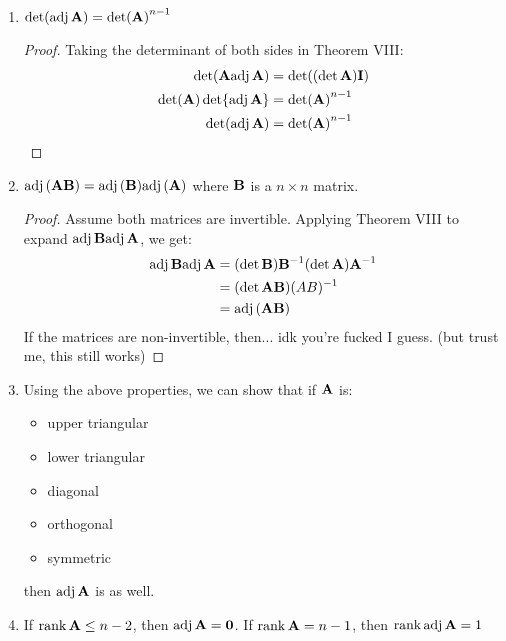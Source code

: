 \documentclass{article}
\begin{document}
\begin{enumerate}
\begin{proof}
\begin{equation*}
                \bff{A}^T\adj(\bff{A})^T = \bff{A}^T\adj(\bff{A}^T)
            \end{equation*}
            If $\bff{A}$ is not the zero matrix, then this directly proves it. If $\bff{A}$ is the zero matrix, then from property $1$, we get: $\adj(\bff{A}^T)=\bff{0}$ and $\adj(\bff{A})^T = \bff{0}^T=\bff{0}$.
        \end{proof}
        \item $\det(\mathrm{adj}\,\mathbf{A})= \det(\mathbf{A})^{n-1}$
        \begin{proof}
            Taking the determinant of both sides in Theorem VIII:
            \begin{align*}
                \det(\mathbf{A}\mathrm{adj}\,\mathbf{A})&=\det((\det \mathbf{A})\mathbf{I}) \\ 
                \det(\mathbf{A})\det{\mathrm{adj}\,\mathbf{A}}&=\det(\mathbf{A})^{n-1} \\ 
                \det(\mathrm{adj}\,\mathbf{A}) &= \det(\mathbf{A})^{n-1}
            \end{align*}
        \end{proof}
        \item $\mathrm{adj}\,(\mathbf{A}\mathbf{B})=\mathrm{adj}\,(\mathbf{B})\mathrm{adj}\,(\mathbf{A})$ where $\mathbf{B}$ is a $n\times n$ matrix.
        \begin{proof}
            Assume both matrices are invertible. Applying Theorem VIII to expand $\mathrm{adj}\,\mathbf{B}\mathrm{adj}\,\mathbf{A}$, we get:
            \begin{align*}
                \mathrm{adj}\,\mathbf{B}\mathrm{adj}\,\mathbf{A} &= (\det \mathbf{B})\mathbf{B}^{-1}(\det \mathbf{A})\mathbf{A}^{-1} \\ 
                &= (\det \mathbf{AB})(AB)^{-1} \\ 
                &= \mathrm{adj}\,(\mathbf{AB})
            \end{align*}
            If the matrices are non-invertible, then... idk you're fucked I guess. (but trust me, this still works)
        \end{proof}
        \item Using the above properties, we can show that if $\mathbf{A}$ is:
        \begin{itemize}
            \item upper triangular
            \item lower triangular
            \item diagonal
            \item orthogonal
            \item symmetric
        \end{itemize}
        then $\mathrm{adj}\,\mathbf{A}$ is as well.
        \item If $\rank \mathbf{A} \le n-2$, then $\mathrm{adj}\,\mathbf{A}=\mathbf{0}$. If $\rank \mathbf{A}=n-1$, then $\rank \mathrm{adj}\,\mathbf{A} = 1$
    \end{enumerate}
\end{document}
